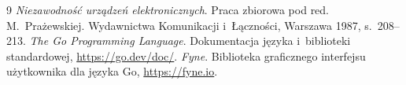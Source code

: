 \documentclass[12pt,a4paper]{article}
\newcommand{\university}{Politechnika Świętokrzyska}
\newcommand{\faculty}{Wydział Elektrotechniki, Automatyki i~Informatyki}
\newcommand{\course}{Niezawodność systemów komputerowych}
\newcommand{\topic}{Wyznaczenie empirycznych wskaźników niezawodności
  $F^*(t)$, $R^*(t)$, $f^*(t)$, $\lambda^*(t)$, $E^*T$ na podstawie próby losowej
  oraz ręcznie wprowadzonych danych}
\newcommand{\authors}{inż.~Filip Stępień\\inż.~Bartłomiej Karkoszka\\inż.~Rafał Grot}
\newcommand{\studentgroup}{2ID21A}
\newcommand{\academicyear}{2026/2027}
\begin{document}

\tableofcontents
\newpage


\clearpage

\clearpage

\clearpage

\clearpage


\begin{thebibliography}{9}
    \emph{Niezawodność urządzeń elektronicznych}. Praca zbiorowa pod red. M.~Prażewskiej.
    Wydawnictwa Komunikacji i~Łączności, Warszawa 1987, s.~208--213.
    \emph{The Go Programming Language}. Dokumentacja języka i~biblioteki standardowej,
    \url{https://go.dev/doc/}.
    \emph{Fyne}. Biblioteka graficznego interfejsu użytkownika dla języka Go,
    \url{https://fyne.io}.
\end{thebibliography}
\end{document}
